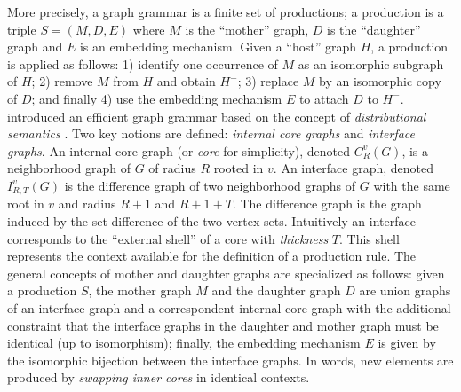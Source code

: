 \documentclass{article}
\begin{document}
More precisely, a graph grammar \citep{rozenberg1999handbook} is a finite set
of productions; a production is a triple $S=(M,D,E)$ where $M$ is the
``mother'' graph, $D$ is the ``daughter'' graph and $E$ is an embedding
mechanism. Given a ``host'' graph $H$, a production is applied as follows: 1)
identify one occurrence of $M$ as an isomorphic subgraph of $H$; 2) remove $M$
from $H$ and obtain $H^-$; 3) replace $M$ by an isomorphic copy of $D$; and
finally 4) use the embedding mechanism $E$ to attach $D$ to $H^-$.
\cite{costa16} introduced an efficient graph grammar based on the concept
of {\em distributional semantics}
\citep{harris1954distributional,harris1968mathematical}. Two
key notions are defined: {\em internal core graphs} and {\em interface graphs}. An
internal core graph (or {\em core} for simplicity), denoted $C^v_R(G)$, is a
neighborhood graph of $G$ of radius $R$ rooted in $v$. An interface graph,
denoted $I^v_{R,T}(G)$ is the difference graph of two neighborhood graphs of
$G$ with the same root in $v$ and radius $R+1$ and $R+1+T$. The difference graph
is the graph induced by the set difference of the two vertex sets. Intuitively
an interface corresponds to the ``external shell'' of a core with {\em
thickness} $T$. This shell represents the context available for the definition
of a production rule. The general concepts of mother and daughter graphs are
specialized as follows: given a production $S$, the mother graph $M$ and the
daughter graph $D$ are union graphs of an interface graph and a correspondent
internal core graph with the additional constraint that the interface graphs
in the daughter and mother graph must be identical (up to isomorphism);
finally, the embedding mechanism $E$ is given by the isomorphic bijection
between the interface graphs. In words, new elements are produced by {\em
swapping inner cores} in identical contexts.




\end{document}
